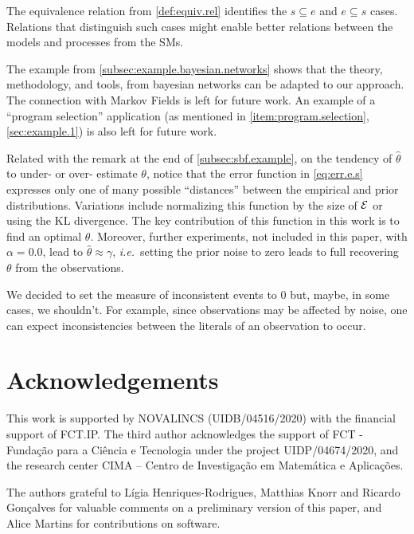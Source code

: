 \documentclass{llncs}
\newcommand{\fml}[1]{\ensuremath{{\cal #1}}}
\newcommand{\oldnote}[1]{\note{#1}}
\renewcommand{\note}[1]{
    \stepcounter{remark}%
    {\!\!\color{red}/}\footnotemark[\arabic{remark}]\!\!%
    \footnotetext[\arabic{remark}]{{\color{red}/}#1}
}
\begin{document}
The equivalence relation from \cref{def:equiv.rel} identifies the $s \subseteq e$ and $e \subseteq s$ cases. Relations that distinguish such cases might enable better relations between the models and processes from the \aclp{SM}.

The example from \cref{subsec:example.bayesian.networks} shows that the theory, methodology, and tools, from bayesian networks can be adapted to our approach. The connection with Markov Fields \cite{kindermann80} is left for future work. An example of a ``program selection'' application (as mentioned in \cref{item:program.selection}, \cref{sec:example.1}) is also left for future work.

Related with the remark at the end of \cref{subsec:sbf.example}, on the tendency of $\hat{\theta}$ to under- or over- estimate $\theta$, notice that the error function in \eqref{eq:err.e.s} expresses only one of many possible ``distances'' between the empirical and prior distributions. Variations include normalizing this function by the size of $\fml{E}$ or using the \acl{KL} divergence. The key contribution of this function in this work is to find an optimal $\theta$. Moreover, further experiments, not included in this paper, with $\alpha = 0.0$, lead to $\hat{\theta} \approx \gamma$, \emph{i.e.}\ setting the prior noise to zero leads to full recovering $\theta$ from the observations.

We decided to set the measure of inconsistent events to $0$ but, maybe, in some cases, we shouldn't. For example, since observations may be affected by noise, one can expect inconsistencies between the literals of an observation to occur.
%
%
%
\section*{Acknowledgements}
%
%
%
This work is supported by NOVALINCS (UIDB/04516/2020) with the financial support of FCT.IP.
The third author acknowledges the support of FCT - Funda\c{c}\~ao para a Ci\^{e}ncia e Tecnologia under the project UIDP/04674/2020, and the research center CIMA -- Centro de Investigação em Matemática e Aplicações.

The authors grateful to Lígia Henriques-Rodrigues, Matthias Knorr and Ricardo Gonçalves for valuable comments on a preliminary version of this paper, and Alice Martins for contributions on software.
%
%
%
\printbibliography
%
%
%
\end{document}
